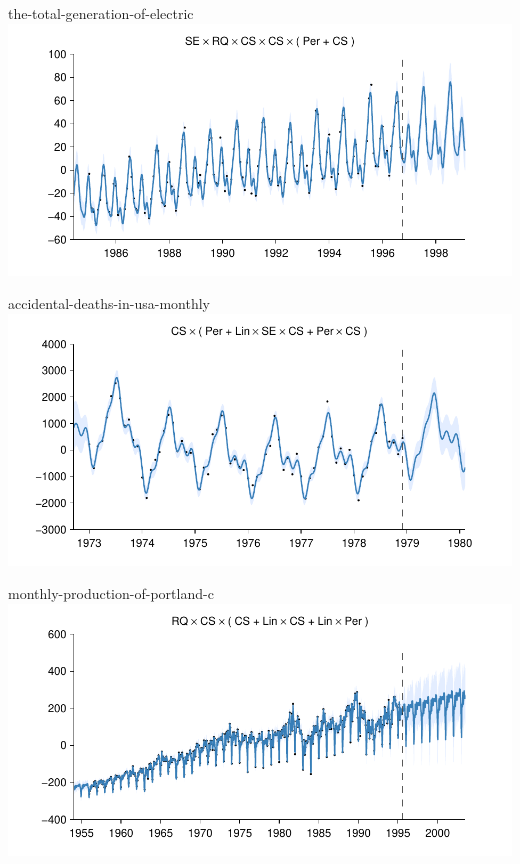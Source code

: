 \begin{frame}{the-total-generation-of-electric}
  \center
  \includegraphics[width=1.0\textwidth]{figures/the-total-generation-of-electric/the-total-generation-of-electric_all}
\end{frame}  

\begin{frame}{accidental-deaths-in-usa-monthly}
  \center
  \includegraphics[width=1.0\textwidth]{figures/accidental-deaths-in-usa-monthly/accidental-deaths-in-usa-monthly_all}
\end{frame}

\begin{frame}{monthly-production-of-portland-c}
  \center
  \includegraphics[width=1.0\textwidth]{figures/monthly-production-of-portland-c/monthly-production-of-portland-c_all}
\end{frame}  

